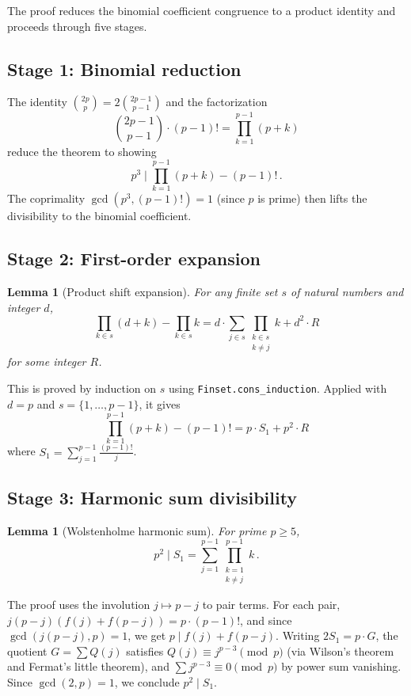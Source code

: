 \documentclass[11pt]{article}
\newtheorem{lemma}[theorem]{Lemma}
\theoremstyle{definition}
\theoremstyle{remark}
\begin{document}
The proof reduces the binomial coefficient congruence to a product identity and proceeds through five stages.

\subsection{Stage 1: Binomial reduction}

The identity $\binom{2p}{p} = 2\binom{2p-1}{p-1}$ and the factorization
\[
\binom{2p-1}{p-1} \cdot (p-1)! = \prod_{k=1}^{p-1}(p+k)
\]
reduce the theorem to showing
\begin{equation}\label{eq:prod_shift}
p^3 \;\Big|\; \prod_{k=1}^{p-1}(p+k) - (p-1)!\,.
\end{equation}
The coprimality $\gcd(p^3, (p-1)!) = 1$ (since $p$ is prime) then lifts the divisibility to the binomial coefficient.

\subsection{Stage 2: First-order expansion}

\begin{lemma}[Product shift expansion]\label{lem:first_order}
For any finite set $s$ of natural numbers and integer $d$,
\[
\prod_{k \in s}(d + k) - \prod_{k \in s} k = d \cdot \sum_{j \in s} \prod_{\substack{k \in s \\ k \neq j}} k + d^2 \cdot R
\]
for some integer $R$.
\end{lemma}

This is proved by induction on $s$ using \texttt{Finset.cons\_induction}. Applied with $d = p$ and $s = \{1, \ldots, p-1\}$, it gives
\[
\prod_{k=1}^{p-1}(p+k) - (p-1)! = p \cdot S_1 + p^2 \cdot R
\]
where $S_1 = \sum_{j=1}^{p-1} \frac{(p-1)!}{j}$.

\subsection{Stage 3: Harmonic sum divisibility}

\begin{lemma}[Wolstenholme harmonic sum]\label{lem:harmonic}
For prime $p \geq 5$,
\[
p^2 \;\Big|\; S_1 = \sum_{j=1}^{p-1} \prod_{\substack{k=1 \\ k \neq j}}^{p-1} k\,.
\]
\end{lemma}

The proof uses the involution $j \mapsto p - j$ to pair terms. For each pair, $j(p-j)(f(j) + f(p-j)) = p \cdot (p-1)!$, and since $\gcd(j(p-j), p) = 1$, we get $p \mid f(j) + f(p-j)$. Writing $2S_1 = p \cdot G$, the quotient $G = \sum Q(j)$ satisfies $Q(j) \equiv j^{p-3} \pmod{p}$ (via Wilson's theorem and Fermat's little theorem), and $\sum j^{p-3} \equiv 0 \pmod{p}$ by power sum vanishing. Since $\gcd(2, p) = 1$, we conclude $p^2 \mid S_1$.
\end{document}
